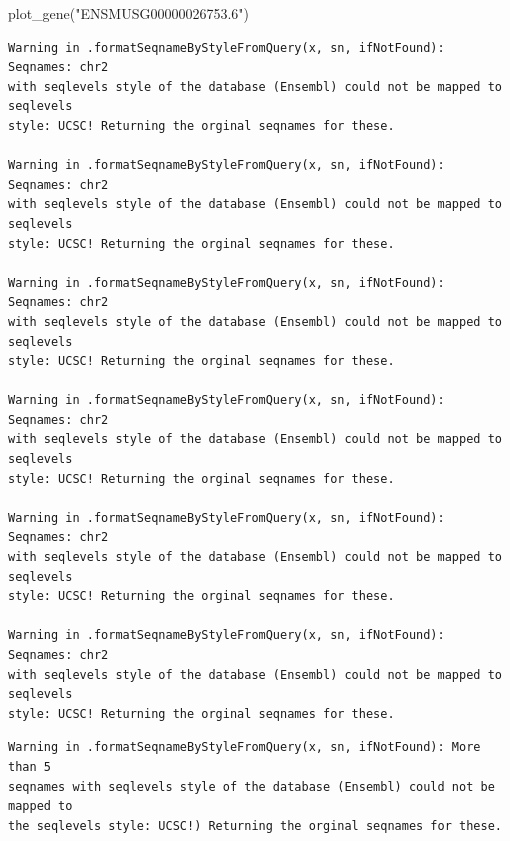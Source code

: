\documentclass[
  letterpaper,
  DIV=11,
  numbers=noendperiod]{scrartcl}
\newenvironment{Shaded}{\begin{snugshade}}{\end{snugshade}}
\newcommand{\FunctionTok}[1]{\textcolor[rgb]{0.28,0.35,0.67}{#1}}
\newcommand{\NormalTok}[1]{\textcolor[rgb]{0.00,0.23,0.31}{#1}}
\newcommand{\StringTok}[1]{\textcolor[rgb]{0.13,0.47,0.30}{#1}}
\begin{document}
\begin{Shaded}
\begin{Highlighting}[]
\FunctionTok{plot\_gene}\NormalTok{(}\StringTok{"ENSMUSG00000026753.6"}\NormalTok{)}
\end{Highlighting}
\end{Shaded}

\begin{verbatim}
Warning in .formatSeqnameByStyleFromQuery(x, sn, ifNotFound): Seqnames: chr2
with seqlevels style of the database (Ensembl) could not be mapped to seqlevels
style: UCSC! Returning the orginal seqnames for these.

Warning in .formatSeqnameByStyleFromQuery(x, sn, ifNotFound): Seqnames: chr2
with seqlevels style of the database (Ensembl) could not be mapped to seqlevels
style: UCSC! Returning the orginal seqnames for these.

Warning in .formatSeqnameByStyleFromQuery(x, sn, ifNotFound): Seqnames: chr2
with seqlevels style of the database (Ensembl) could not be mapped to seqlevels
style: UCSC! Returning the orginal seqnames for these.

Warning in .formatSeqnameByStyleFromQuery(x, sn, ifNotFound): Seqnames: chr2
with seqlevels style of the database (Ensembl) could not be mapped to seqlevels
style: UCSC! Returning the orginal seqnames for these.

Warning in .formatSeqnameByStyleFromQuery(x, sn, ifNotFound): Seqnames: chr2
with seqlevels style of the database (Ensembl) could not be mapped to seqlevels
style: UCSC! Returning the orginal seqnames for these.

Warning in .formatSeqnameByStyleFromQuery(x, sn, ifNotFound): Seqnames: chr2
with seqlevels style of the database (Ensembl) could not be mapped to seqlevels
style: UCSC! Returning the orginal seqnames for these.
\end{verbatim}

\begin{verbatim}
Warning in .formatSeqnameByStyleFromQuery(x, sn, ifNotFound): More than 5
seqnames with seqlevels style of the database (Ensembl) could not be mapped to
the seqlevels style: UCSC!) Returning the orginal seqnames for these.
\end{verbatim}
\end{document}
